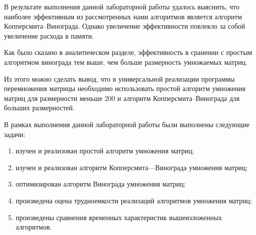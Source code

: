 \Conclusion %

В результате выполнения данной лабораторной работы удалось выяснить, что наиболее эффективным из рассмотренных нами алгоритмов является алгоритм Копперсмита--Винограда. Однако увеличение эффективности повлекло за собой увеличение расхода в памяти. 

Как было сказано в аналитическом разделе, эффективность в сранении с простым алгоритмом винограда тем выше, чем больше размерность умножаемых матриц.

Из этого можно сделать вывод, что в универсальной реализации программы перемножения матрицы необходимо использовать простой алгоритм умножения матриц для размерности меньше 200 и алгоритм Копперсмита--Винограда для больших размерностей.

В рамках выполнения данной лабораторной работы были выполнены следующие задачи:
\begin{enumerate}
    \item изучен и реализован простой алгоритм умножения матриц;
    \item изучен и реализован алгоритм Копперсмита---Винограда умножения матриц; 
    \item оптимизирован алгоритм Винограда умножения матриц; 
    \item произведена оцена трудноемкости реализаций алгоритмов умножения матриц; 
    \item произведены сравнения временных характеристик вышеизложенных алгоритмов.
\end{enumerate}

